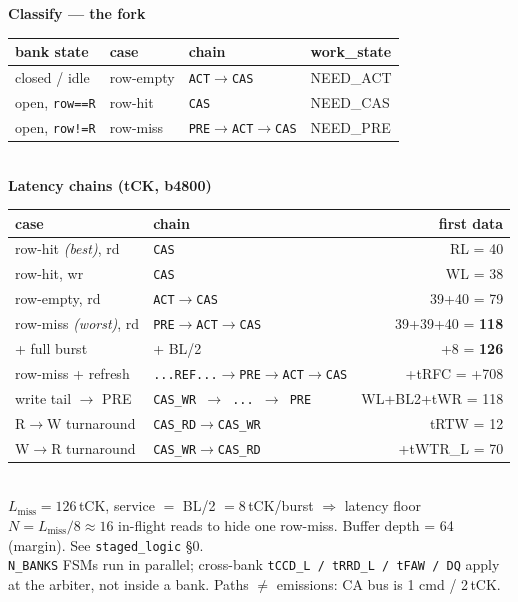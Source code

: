 \documentclass[11pt]{article}
\begin{document}
\begin{minipage}[t]{0.5\textwidth}
{\large\bfseries\color{cArbS} Classify --- the fork}\\[4pt]
{\footnotesize
\begin{tabular}{@{}l l l l@{}}
\toprule
\textbf{bank state} & \textbf{case} & \textbf{chain} & \textbf{work\_state}\\
\midrule
closed / idle & row-empty & \texttt{ACT$\to$CAS} & NEED\_ACT\\
open, \texttt{row==R} & row-hit & \texttt{CAS} & NEED\_CAS\\
open, \texttt{row!=R} & row-miss & \texttt{PRE$\to$ACT$\to$CAS} & NEED\_PRE\\
\bottomrule
\end{tabular}}
\\[10pt]
{\large\bfseries\color{cArbS} Latency chains (tCK, b4800)}\\[4pt]
{\footnotesize
\begin{tabular}{@{}l l r@{}}
\toprule
\textbf{case} & \textbf{chain} & \textbf{first data}\\
\midrule
row-hit \emph{(best)}, rd & \texttt{CAS} & RL = 40\\
row-hit, wr & \texttt{CAS} & WL = 38\\
row-empty, rd & \texttt{ACT$\to$CAS} & 39+40 = 79\\
row-miss \emph{(worst)}, rd & \texttt{PRE$\to$ACT$\to$CAS} & 39+39+40 = \textbf{118}\\
\quad + full burst & \quad + BL/2 & +8 = \textbf{126}\\
row-miss + refresh & \texttt{...REF...$\to$PRE$\to$ACT$\to$CAS} & +tRFC = +708\\
write tail $\to$ PRE & \texttt{CAS\_WR $\to$ ... $\to$ PRE} & WL+BL2+tWR = 118\\
R$\to$W turnaround & \texttt{CAS\_RD$\to$CAS\_WR} & tRTW = 12\\
W$\to$R turnaround & \texttt{CAS\_WR$\to$CAS\_RD} & +tWTR\_L = 70\\
\bottomrule
\end{tabular}}
\\[8pt]
{\footnotesize $L_{\text{miss}}=126$\,tCK, service $=$ BL/2 $=8$\,tCK/burst $\Rightarrow$ latency floor $N=L_{\text{miss}}/8\approx16$ in-flight reads to hide one row-miss. Buffer depth = 64 (margin). See \texttt{staged\_logic} \S0.}\\[6pt]
{\footnotesize\color{cSlate} \texttt{N\_BANKS} FSMs run in parallel; cross-bank \texttt{tCCD\_L / tRRD\_L / tFAW / DQ} apply at the arbiter, not inside a bank. Paths $\neq$ emissions: CA bus is 1 cmd / 2\,tCK.}
\end{minipage}
\end{document}
